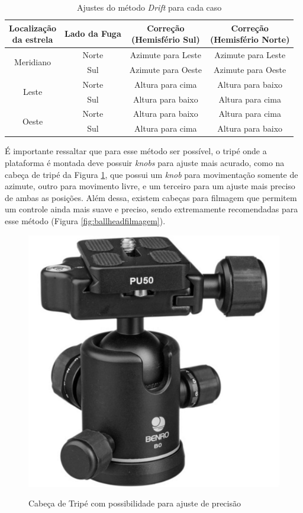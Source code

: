 \begin{table}[!htp]
	\centering
	\caption{Ajustes do método \textit{Drift} para cada caso}
	\label{tab:drift}		
		\begin{tabular}{c|c|c|c}
			\makecell{Localização\\da estrela} & Lado da Fuga & \makecell{Correção\\(Hemisfério Sul)}& \makecell{Correção\\(Hemisfério Norte)}\\  \hline
			\multirow{2}{*}{ Meridiano } & Norte & Azimute para Leste & Azimute para Leste \\ \cline{2-4}
			& Sul & Azimute para Oeste & Azimute para Oeste \\ \hline
			\multirow{2}{*}{ Leste } & Norte & Altura para cima & Altura para baixo \\ \cline{2-4}
			& Sul & Altura para baixo & Altura para cima \\ \hline
			\multirow{2}{*}{ Oeste } & Norte & Altura para baixo & Altura para cima \\ \cline{2-4}
			& Sul & Altura para cima & Altura para baixo \\ 
		\end{tabular}
	
\end{table}

É importante ressaltar que para esse método ser possível, o tripé onde a plataforma é montada deve possuir \textit{knobs} para ajuste mais acurado, como na cabeça de tripé da Figura \ref{fig:ballhead}, que possui um \textit{knob} para movimentação somente de azimute, outro para movimento livre, e um terceiro para um ajuste mais preciso de ambas as posições. Além dessa, existem cabeças para filmagem que permitem um controle ainda mais suave e preciso, sendo extremamente recomendadas para esse método (Figura \ref{fig:ballheadfilmagem}).

\begin{figure}[!htb]
	\centering
	\caption{Cabeça de Tripé com possibilidade para ajuste de precisão}
	\includegraphics[width=0.3\linewidth]{figuras/revisaobiblio/ballhead}
	\label{fig:ballhead}
\end{figure}

